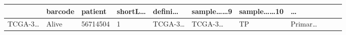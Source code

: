 \documentclass[
]{article}
\begin{document}
\begin{longtable}[]{@{}lllllllllll@{}}
\begin{minipage}[b]{0.07\columnwidth}
\end{minipage} & \begin{minipage}[b]{0.07\columnwidth}\raggedright
barcode\strut
\end{minipage} & \begin{minipage}[b]{0.07\columnwidth}\raggedright
patient\strut
\end{minipage} & \begin{minipage}[b]{0.07\columnwidth}\raggedright
shortL\ldots{}\strut
\end{minipage} & \begin{minipage}[b]{0.07\columnwidth}\raggedright
defini\ldots{}\strut
\end{minipage} & \begin{minipage}[b]{0.09\columnwidth}\raggedright
sample\ldots\ldots9\strut
\end{minipage} & \begin{minipage}[b]{0.10\columnwidth}\raggedright
sample\ldots\ldots10\strut
\end{minipage} & \begin{minipage}[b]{0.03\columnwidth}\raggedright
\ldots{}\strut
\end{minipage}\tabularnewline
\midrule
\endhead
\begin{minipage}[t]{0.07\columnwidth}\raggedright
TCGA-3\ldots{}\strut
\end{minipage} & \begin{minipage}[t]{0.04\columnwidth}\raggedright
Alive\strut
\end{minipage} & \begin{minipage}[t]{0.06\columnwidth}\raggedright
56714504\strut
\end{minipage} & \begin{minipage}[t]{0.07\columnwidth}\raggedright
1\strut
\end{minipage} & \begin{minipage}[t]{0.07\columnwidth}\raggedright
TCGA-3\ldots{}\strut
\end{minipage} & \begin{minipage}[t]{0.07\columnwidth}\raggedright
TCGA-3\ldots{}\strut
\end{minipage} & \begin{minipage}[t]{0.07\columnwidth}\raggedright
TP\strut
\end{minipage} & \begin{minipage}[t]{0.07\columnwidth}\raggedright
Primar\ldots{}\strut
\end{minipage} & \begin{minipage}[t]{0.09\columnwidth}\raggedright

\end{minipage}
\end{longtable}
\end{document}

